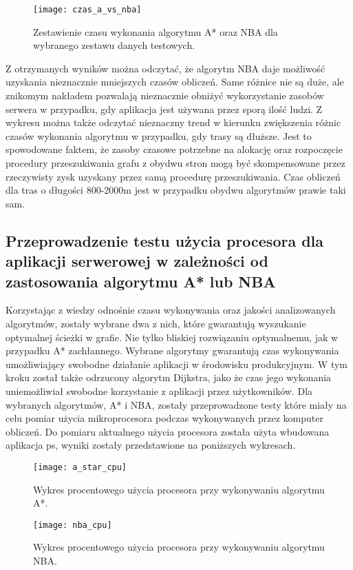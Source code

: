 \begin{figure}[H]
\centering
\texttt{[image: czas\_a\_vs\_nba]}
\caption{Zestawienie czasu wykonania algorytmu A* oraz NBA dla wybranego zestawu danych testowych.}
\end{figure}

Z otrzymanych wyników można odczytać, że algorytm NBA daje możliwość uzyskania nieznacznie mniejszych czasów obliczeń. Same różnice nie są duże, ale znikomym nakładem pozwalają nieznacznie obniżyć wykorzystanie zasobów serwera w przypadku, gdy aplikacja jest używana przez sporą ilość ludzi. Z wykresu można także odczytać nieznaczny trend w kierunku zwiększenia różnic czasów wykonania algorytmu w przypadku, gdy trasy są dłuższe. Jest to spowodowane faktem, że zasoby czasowe potrzebne na alokację oraz rozpoczęcie procedury przeszukiwania grafu z obydwu stron mogą być skompensowane przez rzeczywisty zysk uzyskany przez samą procedurę przeszukiwania. Czas obliczeń dla tras o długości 800-2000m jest w przypadku obydwu algorytmów prawie taki sam.

\subsection{Przeprowadzenie testu użycia procesora dla aplikacji serwerowej w zależności od zastosowania algorytmu A* lub NBA}

Korzystając z wiedzy odnośnie czasu wykonywania oraz jakości analizowanych algorytmów, zostały wybrane dwa z nich, które gwarantują wyszukanie optymalnej ścieżki w grafie. Nie tylko bliskiej rozwiązaniu optymalnemu, jak w przypadku A* zachłannego. Wybrane algorytmy gwarantują czas wykonywania umożliwiający swobodne działanie aplikacji w środowisku produkcyjnym. W tym kroku został także odrzucony algorytm Dijkstra, jako że czas jego wykonania uniemożliwiał swobodne korzystanie z aplikacji przez użytkowników. Dla wybranych algorytmów, A* i NBA, zostały przeprowadzone testy które miały na celu pomiar użycia mikroprocesora podczas wykonywanych przez komputer obliczeń. Do pomiaru aktualnego użycia procesora została użyta wbudowana aplikacja ps, wyniki zostały przedstawione na poniższych wykresach.

\begin{figure}[H]
\centering
\texttt{[image: a\_star\_cpu]}
\caption{Wykres procentowego użycia procesora przy wykonywaniu algorytmu A*.}
\end{figure}

\begin{figure}[H]
\centering
\texttt{[image: nba\_cpu]}
\caption{Wykres procentowego użycia procesora przy wykonywaniu algorytmu NBA.}
\end{figure}

